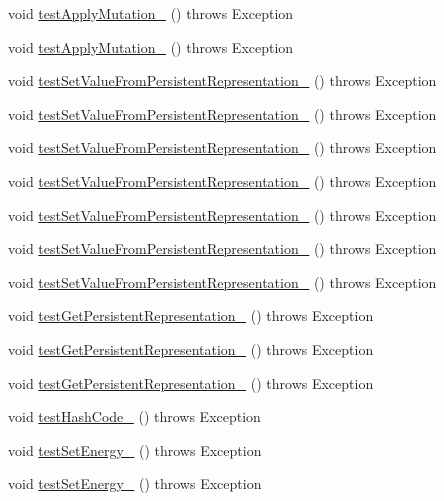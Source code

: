 \begin{DoxyCompactItemize}
\item 
void \hyperlink{classorg_1_1jgap_1_1impl_1_1_set_gene_test_a8a656b48f9e117b4e76fa60e56d61514}{test\-Apply\-Mutation\-\_} ()  throws Exception 
\item 
void \hyperlink{classorg_1_1jgap_1_1impl_1_1_set_gene_test_af76b630f1a08bf5e6a85cd2f834c6346}{test\-Apply\-Mutation\-\_} ()  throws Exception 
\item 
void \hyperlink{classorg_1_1jgap_1_1impl_1_1_set_gene_test_a99a3b7cc1d954d4deb5b2d6d8b676e9e}{test\-Set\-Value\-From\-Persistent\-Representation\-\_} ()  throws Exception 
\item 
void \hyperlink{classorg_1_1jgap_1_1impl_1_1_set_gene_test_a0f95af661fa009571d9d1d73d9860184}{test\-Set\-Value\-From\-Persistent\-Representation\-\_} ()  throws Exception 
\item 
void \hyperlink{classorg_1_1jgap_1_1impl_1_1_set_gene_test_a222bd7b1b829b94a1789ce8f0bb91445}{test\-Set\-Value\-From\-Persistent\-Representation\-\_} ()  throws Exception 
\item 
void \hyperlink{classorg_1_1jgap_1_1impl_1_1_set_gene_test_a5acd1e84539f21b4288986abaa4faba8}{test\-Set\-Value\-From\-Persistent\-Representation\-\_} ()  throws Exception 
\item 
void \hyperlink{classorg_1_1jgap_1_1impl_1_1_set_gene_test_aa3118c50bc884e2f74d31224661407e0}{test\-Set\-Value\-From\-Persistent\-Representation\-\_} ()  throws Exception 
\item 
void \hyperlink{classorg_1_1jgap_1_1impl_1_1_set_gene_test_ad4d35daf8bdc828ff3d20a19fe21daf5}{test\-Set\-Value\-From\-Persistent\-Representation\-\_} ()  throws Exception 
\item 
void \hyperlink{classorg_1_1jgap_1_1impl_1_1_set_gene_test_a0eed66e84b3aa39c0049cb662c7bbe02}{test\-Set\-Value\-From\-Persistent\-Representation\-\_} ()  throws Exception 
\item 
void \hyperlink{classorg_1_1jgap_1_1impl_1_1_set_gene_test_a30cefa0a1de0f01db24ae33589f0d699}{test\-Get\-Persistent\-Representation\-\_} ()  throws Exception 
\item 
void \hyperlink{classorg_1_1jgap_1_1impl_1_1_set_gene_test_a74a5193c7621bf17f738e0c47bec9d18}{test\-Get\-Persistent\-Representation\-\_} ()  throws Exception 
\item 
void \hyperlink{classorg_1_1jgap_1_1impl_1_1_set_gene_test_a74775921a8a254f97066cd8bb406ad46}{test\-Get\-Persistent\-Representation\-\_} ()  throws Exception 
\item 
void \hyperlink{classorg_1_1jgap_1_1impl_1_1_set_gene_test_a624f32a594c9dafb7590324ce3e0cd50}{test\-Hash\-Code\-\_} ()  throws Exception 
\item 
void \hyperlink{classorg_1_1jgap_1_1impl_1_1_set_gene_test_a20128230b05f932ca8dd789a19e20823}{test\-Set\-Energy\-\_} ()  throws Exception 
\item 
void \hyperlink{classorg_1_1jgap_1_1impl_1_1_set_gene_test_a1554cf6128cd642a799c38d7ae398776}{test\-Set\-Energy\-\_} ()  throws Exception 
\end{DoxyCompactItemize}
